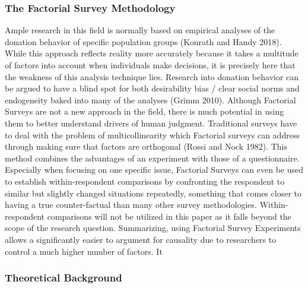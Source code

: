 \documentclass[
  12pt,
]{article}
\begin{document}
\hypertarget{the-factorial-survey-methodology}{%
\subsubsection{The Factorial Survey
Methodology}\label{the-factorial-survey-methodology}}

Ample research in this field is normally based on empirical analyses of
the donation behavior of specific population groups (Konrath and Handy
2018). While this approach reflects reality more accurately because it
takes a multitude of factors into account when individuals make
decisions, it is precisely here that the weakness of this analysis
technique lies. Research into donation behavior can be argued to have a
blind spot for both desirability bias / clear social norms and
endogeneity baked into many of the analyses (Grimm 2010). Although
Factorial Surveys are not a new approach in the field, there is much
potential in using them to better understand drivers of human judgment.
Traditional surveys have to deal with the problem of multicollinearity
which Factorial surveys can address through making sure that factors are
orthogonal (Rossi and Nock 1982). This method combines the advantages of
an experiment with those of a questionnaire. Especially when focusing on
one specific issue, Factorial Surveys can even be used to establish
within-respondent comparisons by confronting the respondent to similar
but slightly changed situations repeatedly, something that comes closer
to having a true counter-factual than many other survey methodologies.
Within-respondent comparisons will not be utilized in this paper as it
falls beyond the scope of the research question. Summarizing, using
Factorial Survey Experiments allows a significantly easier to argument
for causality due to researchers to control a much higher number of
factors. It

\hypertarget{theoretical-background}{%
\subsubsection{Theoretical Background}\label{theoretical-background}}
\end{document}
